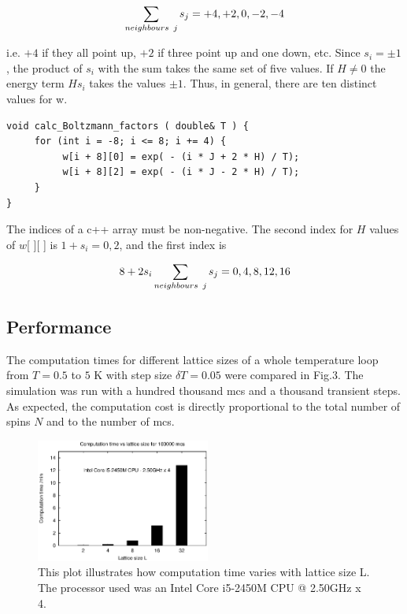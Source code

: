 \documentclass[a4paper]{article}
\begin{document}
\begin{equation}
\sum_{\substack{ neighbours\hspace{1.5mm} j}} s_j = +4,+2,0,-2,-4
\end{equation}

i.e. $+4$ if they all point up, $+2$ if three point up and one down, etc. Since  $s_i = \pm 1$, the product of $s_i$ with the sum takes the same set of five values. If $H \neq 0$ the energy term $H s_i$ takes the values $\pm 1$. Thus, in general, there are ten distinct values for w.
\begin{verbatim}
void calc_Boltzmann_factors ( double& T ) {
     for (int i = -8; i <= 8; i += 4) {
          w[i + 8][0] = exp( - (i * J + 2 * H) / T);
          w[i + 8][2] = exp( - (i * J - 2 * H) / T);
     }
}
\end{verbatim}
The indices of a c\scriptsize{++} \normalsize array must be non-negative. The second index for $H$ values of $w$[ ][ ] is $1+s_i = 0,2$, and the first index is

\begin{equation}
8 + 2 s_i \sum_{\substack{ neighbours \hspace{1.5mm} j}} s_j = 0,4,8,12,16
\end{equation}


\subsection{Performance}

The computation times for different lattice sizes of a whole temperature loop from $T = 0.5$ to $5$ K with step size $\delta T = 0.05$ were compared in Fig.3.
The simulation was run with a hundred thousand mcs and a thousand transient steps. As expected, the computation cost is directly proportional to the total number of spins $N$ and to the number of mcs.

\begin{figure}[H]
\centering
\includegraphics[width=0.51\textwidth]{histogram.eps}
\caption{This plot illustrates how computation time varies with lattice size L. The processor used was an Intel Core i5-2450M CPU @ 2.50GHz x 4.}
\end{figure}
\end{document}
